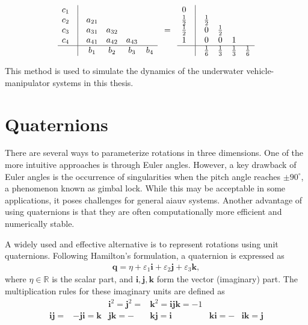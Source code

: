 \begin{align}
    \begin{matrix}
        c_1 & \vline & & & & \\
        c_2 & \vline & a_{21} & & & \\
        c_3 & \vline & a_{31} & a_{32} & & \\
        c_4 & \vline & a_{41} & a_{42} & a_{43} & \\
        \hline
        & \vline & b_1 & b_2 & b_3 & b_4
    \end{matrix}
    \quad=\quad 
    \begin{matrix}
        0 & \vline & & & & \\
        \frac{1}{2} & \vline & \frac{1}{2} & & & \\
        \frac{1}{2} & \vline & 0 & \frac{1}{2} & & \\
        1 & \vline & 0 & 0 & 1 & \\
        \hline
        & \vline & \frac{1}{6} & \frac{1}{3} & \frac{1}{3} & \frac{1}{6}
    \end{matrix}
\end{align}

This method is used to simulate the dynamics of the underwater vehicle-manipulator
systems in this thesis.

\section{Quaternions}
\label{sec:background:quaternions}

There are several ways to parameterize rotations in three dimensions. One of 
the more intuitive approaches is through Euler angles. However, a key drawback 
of Euler angles is the occurrence of singularities when the pitch angle 
reaches $\pm90^\circ$, a phenomenon known as gimbal lock. While this may be 
acceptable in some applications, it poses challenges for general \gls{aiauv} 
systems. Another advantage of using quaternions is that they are often computationally more efficient and numerically stable. 

A widely used and effective alternative is to represent rotations using unit 
quaternions. Following Hamilton’s formulation, a quaternion is expressed as
\begin{align}
    \bm{q} = \eta + \varepsilon_1 \bm{i} + \varepsilon_2 \bm{j} + \varepsilon_3 \bm{k},
\end{align}
where $\eta \in \mathbb{R}$ is the scalar part, and \(\bm{i}, \bm{j}, \bm{k}\) 
form the vector (imaginary) part. The multiplication rules for these imaginary 
units are defined as
\begin{align}
    && \bm{i}^2 = \bm{j}^2 = &\bm{k}^2 = \bm{i}\bm{j}\bm{k} = -1 &&\\
    \bm{i}\bm{j} = &-\bm{j}\bm{i} = \bm{k} & \bm{j}\bm{k} = -&\bm{k}\bm{j} = \bm{i} & \bm{k}\bm{i} = -&\bm{i}\bm{k} = \bm{j}
\end{align}


